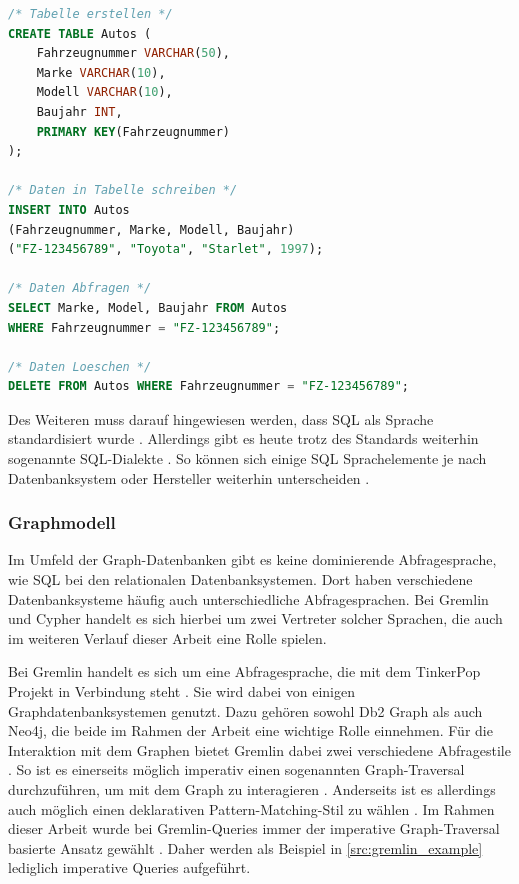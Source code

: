 \begin{lstlisting}[caption={Beispiel SQL-Queries},language=SQL,label=src:sql_example]
/* Tabelle erstellen */
CREATE TABLE Autos (
    Fahrzeugnummer VARCHAR(50), 
    Marke VARCHAR(10), 
    Modell VARCHAR(10), 
    Baujahr INT,
    PRIMARY KEY(Fahrzeugnummer)
);

/* Daten in Tabelle schreiben */
INSERT INTO Autos 
(Fahrzeugnummer, Marke, Modell, Baujahr) 
("FZ-123456789", "Toyota", "Starlet", 1997);

/* Daten Abfragen */
SELECT Marke, Model, Baujahr FROM Autos 
WHERE Fahrzeugnummer = "FZ-123456789";

/* Daten Loeschen */
DELETE FROM Autos WHERE Fahrzeugnummer = "FZ-123456789";
\end{lstlisting}

Des Weiteren muss darauf hingewiesen werden, dass SQL als Sprache standardisiert wurde \cite{sql_history}. Allerdings gibt es heute trotz des Standards weiterhin sogenannte SQL-Dialekte \cite{sql_2017}. So können sich einige SQL Sprachelemente je nach Datenbanksystem oder Hersteller weiterhin unterscheiden \cite{sql_2017}. 

\subsubsection{Graphmodell}

Im Umfeld der Graph-Datenbanken gibt es keine dominierende Abfragesprache, wie SQL bei den relationalen Datenbanksystemen. Dort haben verschiedene Datenbanksysteme häufig auch unterschiedliche Abfragesprachen. Bei Gremlin und Cypher handelt es sich hierbei um zwei Vertreter solcher Sprachen, die auch im weiteren Verlauf dieser Arbeit eine Rolle spielen. 

Bei Gremlin handelt es sich um eine Abfragesprache, die mit dem TinkerPop Projekt in Verbindung steht \cite{tinkerpop_2020}. Sie wird dabei von einigen Graphdatenbanksystemen genutzt. Dazu gehören sowohl Db2 Graph als auch Neo4j, die beide im Rahmen der Arbeit eine wichtige Rolle einnehmen. Für die Interaktion mit dem Graphen bietet Gremlin dabei zwei verschiedene Abfragestile \cite{gremlin_paper}. So ist es einerseits möglich imperativ einen sogenannten Graph-Traversal durchzuführen, um mit dem Graph zu interagieren \cite{gremlin_paper}. Anderseits ist es allerdings auch möglich einen deklarativen Pattern-Matching-Stil zu wählen \cite{gremlin_paper}. Im Rahmen dieser Arbeit wurde bei Gremlin-Queries immer der imperative Graph-Traversal basierte Ansatz gewählt \cite{gremlin_paper}. Daher werden als Beispiel in \autoref{src:gremlin_example} lediglich imperative Queries aufgeführt. 

